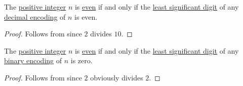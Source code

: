 \begin{corollary}\label{thm:nonnegative_integer_decimal_expansion_parity}
  The \hyperref[def:integers]{positive integer} \( n \) is \hyperref[def:integer_parity]{even} if and only if the \hyperref[def:endianness]{least significant digit} of any \hyperref[def:ring_of_unsigned_integers]{decimal encoding} of \( n \) is even.
\end{corollary}
\begin{proof}
  Follows from  since \( 2 \) divides \( 10 \).
\end{proof}

\begin{corollary}\label{thm:nonnegative_integer_binary_expansion_parity}
  The \hyperref[def:integers]{positive integer} \( n \) is \hyperref[def:integer_parity]{even} if and only if the \hyperref[def:endianness]{least significant digit} of any \hyperref[def:ring_of_unsigned_integers]{binary encoding} of \( n \) is zero.
\end{corollary}
\begin{proof}
  Follows from  since \( 2 \) obviously divides \( 2 \).
\end{proof}

